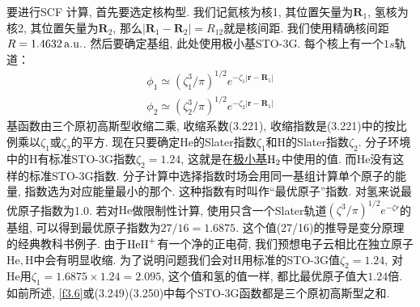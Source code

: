 {要进行SCF
计算, 首先要选定核构型. 我们记氦核为核1, 其位置矢量为$\mathbf{R}_1$, 氢核为核2, 其位置矢量为$\mathbf{R}_2$, 那么$|\mathbf{R}_1-\mathbf{R}_2|=R_{12}$就是核间距. 我们使用精确核间距$R=1.4632\,\mathrm{a.u.}$. 然后要确定基组, 此处使用极小基STO-3G. 每个核上有一个$1s$轨道：
\begin{align}
\phi_1 \simeq (\zeta_1^3/\pi)^{1/2} e^{-\zeta_1|\mathbf{r-R}_1|}\\
\phi_2 \simeq (\zeta_2^3/\pi)^{1/2} e^{-\zeta_2|\mathbf{r-R}_1|}
\end{align}
基函数由三个原初高斯型收缩二乘, 收缩系数(3.221), 收缩指数是(3.221)中的按比例乘以$\zeta_1$或$\zeta_2$的平方. 现在只要确定$\mathrm{He}$的Slater指数$\zeta_1$和$\mathrm{H}$的Slater指数$\zeta_2$. 分子环境中的$\mathrm{H}$有标准STO-3G指数$\zeta_2=1.24$, 这就是在\underline{极小基$\mathrm{H}_2$}中使用的值. 而$\mathrm{He}$没有这样的标准STO-3G指数. 分子计算中选择指数时场会用同一基组计算单个原子的能量, 指数选为对应能量最小的那个. 这种指数有时叫作``最优原子''指数. 对氢来说最优原子指数为1.0. 若对$\mathrm{He}$做限制性\hft 计算, 使用只含一个Slater轨道$(\zeta^3/\pi)^{1/2}e^{-\zeta r}$的基组, 可以得到最优原子指数为$27/16=1.6875$. 这个值(27/16)的推导是变分原理的经典教科书例子. 由于$\mathrm{HeH}^+$有一个净的正电荷, 我们预想电子云相比在独立原子$\mathrm{He,H}$中会有明显收缩. 为了说明问题我们会对$\mathrm{H}$用标准的STO-3G值$\zeta_2=1.24$, 对$\mathrm{He}$用$\zeta_1=1.6875\times 1.24=2.095$, 这个值和氢的值一样, 都比最优原子值大$1.24$倍. 如前所述, \ref{f3.6}或(3.249)(3.250)中每个STO-3G函数都是三个原初高斯型之和.

}
